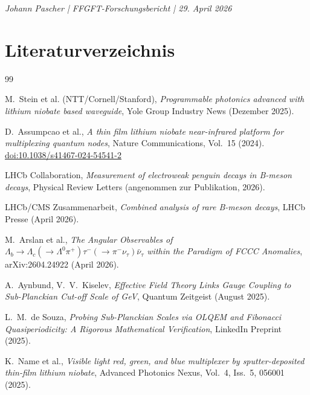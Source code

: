 	\vspace{2cm}
	\begin{center}
		\small \textit{Johann Pascher | FFGFT-Forschungsbericht | 29. April 2026}
	\end{center}
	
	\newpage
	\section*{Literaturverzeichnis}
	
	\begin{thebibliography}{99}
		
		M.~Stein et al. (NTT/Cornell/Stanford), 
		\textit{Programmable photonics advanced with lithium niobate based waveguide},
		Yole Group Industry News (Dezember 2025).
		
		D.~Assumpcao et al., 
		\textit{A thin film lithium niobate near-infrared platform for multiplexing quantum nodes},
		Nature Communications, Vol.~15 (2024).
		\href{https://doi.org/10.1038/s41467-024-54541-2}{doi:10.1038/s41467-024-54541-2}
		
		LHCb Collaboration, 
		\textit{Measurement of electroweak penguin decays in B-meson decays},
		Physical Review Letters (angenommen zur Publikation, 2026).
		
		LHCb/CMS Zusammenarbeit,
		\textit{Combined analysis of rare B-meson decays},
		LHCb Presse (April 2026).
		
		M.~Arslan et al., 
		\textit{The Angular Observables of $\Lambda_b \to \Lambda_c(\to \Lambda^0 \pi^+) \tau^-(\to \pi^- \nu_\tau) \bar{\nu}_\tau$ within the Paradigm of FCCC Anomalies},
		arXiv:2604.24922 (April 2026).
		
		A.~Aynbund, V.~V.~Kiselev, 
		\textit{Effective Field Theory Links Gauge Coupling to Sub-Planckian Cut-off Scale of GeV},
		Quantum Zeitgeist (August 2025).
		
		L.~M.~de Souza, 
		\textit{Probing Sub-Planckian Scales via OLQEM and Fibonacci Quasiperiodicity: A Rigorous Mathematical Verification},
		LinkedIn Preprint (2025).
		
		K.~Name et al., 
		\textit{Visible light red, green, and blue multiplexer by sputter-deposited thin-film lithium niobate},
		Advanced Photonics Nexus, Vol.~4, Iss.~5, 056001 (2025).
		
	\end{thebibliography}
	
